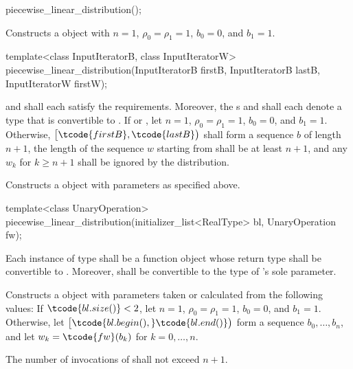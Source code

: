 \begin{itemdecl}
piecewise_linear_distribution();
\end{itemdecl}

\begin{itemdescr}
\pnum\effects Constructs a  object
 with $n = 1$,
 $\rho_0 = \rho_1 = 1$,
 $b_0 = 0$,
 and $b_1 = 1$.
\end{itemdescr}

\begin{itemdecl}
template<class InputIteratorB, class InputIteratorW>
 piecewise_linear_distribution(InputIteratorB firstB, InputIteratorB lastB,
                               InputIteratorW firstW);
\end{itemdecl}

\begin{itemdescr}
\pnum\requires
   and 
  shall each satisfy the
   requirements.
  Moreover,
  the s
   and
  shall each denote a type that is convertible to .
 If 
 or ,
 let $n = 1$,
     $\rho_0 = \rho_1 = 1$,
     $b_0 = 0$,
 and $b_1 = 1$.
 Otherwise,
 $\bigl[\tcode{firstB}, \tcode{lastB}\bigr)$
 shall form a sequence $b$ of length $n+1$,
 the length of the sequence $w$ starting from 
 shall be at least $n+1$,
 and any $w_k$ for $k \geq n + 1$ shall be ignored by the distribution.

\pnum\effects Constructs a  object
 with parameters as specified above.
\end{itemdescr}


%
\begin{itemdecl}
template<class UnaryOperation>
 piecewise_linear_distribution(initializer_list<RealType> bl, UnaryOperation fw);
\end{itemdecl}

\begin{itemdescr}
\pnum\requires
 Each instance of type 
 shall be a function object
 whose return type shall be convertible to .
 Moreover,
  shall be convertible
 to the type of 's sole parameter.

\pnum\effects Constructs a  object
 with parameters taken or calculated
 from the following values:
 If $\tcode{bl.size()} < 2$,
 let $n = 1$,
     $\rho_0 = \rho_1 = 1$,
     $b_0 = 0$,
 and $b_1 = 1$.
 Otherwise,
 let $\bigl[\tcode{bl.begin(),} \tcode{bl.end()}\bigr)$
 form a sequence $b_0, \dotsc, b_n$,
 and
 let $w_k = \tcode{fw}(b_k)$
 for $k = 0, \dotsc, n$.

\pnum\complexity
 The number of invocations of  shall not exceed $n+1$.
\end{itemdescr}


